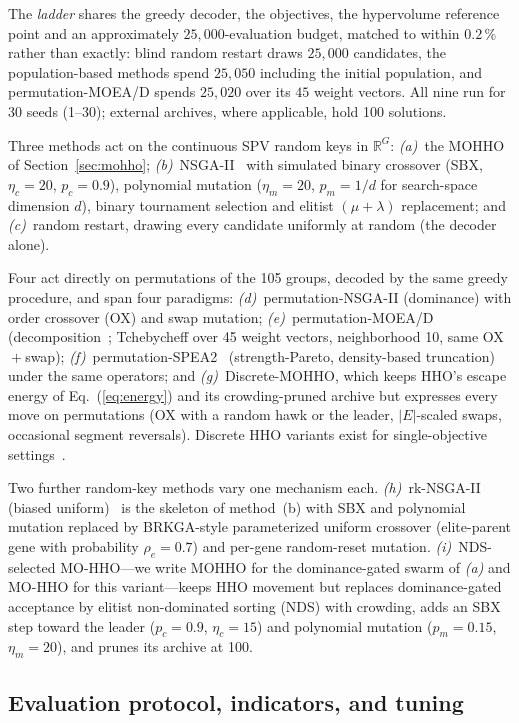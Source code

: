 \documentclass[runningheads]{llncs}
\begin{document}
The \emph{ladder} shares the greedy decoder, the objectives, the hypervolume reference point and an approximately $25{,}000$-evaluation budget, matched to within $0.2\,\%$ rather than exactly: blind random restart draws $25{,}000$ candidates, the population-based methods spend $25{,}050$ including the initial population, and permutation-MOEA/D spends $25{,}020$ over its $45$ weight vectors. All nine run for 30 seeds (1--30); external archives, where applicable, hold 100 solutions.

Three methods act on the continuous SPV random keys in $\mathbb{R}^{G}$: \emph{(a)}~the MOHHO of Section~\ref{sec:mohho}; \emph{(b)}~NSGA-II~\cite{deb} with simulated binary crossover (SBX, $\eta_c=20$, $p_c=0.9$), polynomial mutation ($\eta_m=20$, $p_m=1/d$ for search-space dimension $d$), binary tournament selection and elitist $(\mu+\lambda)$ replacement; and \emph{(c)}~random restart, drawing every candidate uniformly at random (the decoder alone).

Four act directly on permutations of the 105 groups, decoded by the same greedy procedure, and span four paradigms: \emph{(d)}~permutation-NSGA-II (dominance) with order crossover (OX) and swap mutation; \emph{(e)}~permutation-MOEA/D (decomposition~\cite{zhangli}; Tchebycheff over 45 weight vectors, neighborhood 10, same OX${}+{}$swap); \emph{(f)}~permutation-SPEA2~\cite{spea2} (strength-Pareto, density-based truncation) under the same operators; and \emph{(g)}~Discrete-MOHHO, which keeps HHO's escape energy of Eq.~(\ref{eq:energy}) and its crowding-pruned archive but expresses every move on permutations (OX with a random hawk or the leader, $|E|$-scaled swaps, occasional segment reversals). Discrete HHO variants exist for single-objective settings~\cite{gezici}.

Two further random-key methods vary one mechanism each. \emph{(h)}~rk-NSGA-II (biased uniform)~\cite{goncalves} is the skeleton of method~(b) with SBX and polynomial mutation replaced by BRKGA-style parameterized uniform crossover (elite-parent gene with probability $\rho_e=0.7$) and per-gene random-reset mutation. \emph{(i)}~NDS-selected MO-HHO---we write MOHHO for the dominance-gated swarm of \emph{(a)} and MO-HHO for this variant---keeps HHO movement but replaces dominance-gated acceptance by elitist non-dominated sorting (NDS) with crowding, adds an SBX step toward the leader ($p_c=0.9$, $\eta_c=15$) and polynomial mutation ($p_m=0.15$, $\eta_m=20$), and prunes its archive at 100.

\subsection{Evaluation protocol, indicators, and tuning}
\label{sec:protocol}
\end{document}

